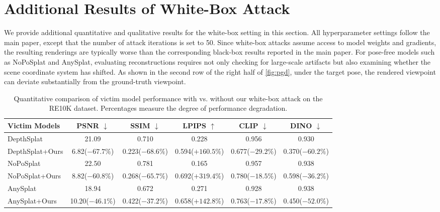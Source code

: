 \clearpage
\section{Additional Results of White-Box Attack}
We provide additional quantitative and qualitative results for the white-box setting in this section. All hyperparameter settings follow the main paper, except that the number of attack iterations is set to 50. Since white-box attacks assume access to model weights and gradients, the resulting renderings are typically worse than the corresponding black-box results reported in the main paper. For pose-free models such as NoPoSplat and AnySplat, evaluating reconstructions requires not only checking for large-scale artifacts but also examining whether the scene coordinate system has shifted. As shown in the second row of the right half of \cref{fig:pgd}, under the target pose, the rendered viewpoint can deviate substantially from the ground-truth viewpoint.

\begin{table}[h]
\centering
\caption{Quantitative comparison of victim model performance with vs. without our white-box attack on the RE10K dataset. Percentages measure the degree of performance degradation.}
\label{tab:re10k_new}
{\fontsize{7pt}{8pt}\selectfont
\begin{tabular}{l ccccc}
\toprule
Victim Models & \cellcolor{gray!20}PSNR $\downarrow$ & \cellcolor{gray!20}SSIM $\downarrow$ & \cellcolor{gray!20}LPIPS $\uparrow$ & \cellcolor{gray!20}CLIP $\downarrow$ & \cellcolor{gray!20}DINO $\downarrow$ \\
\midrule
DepthSplat           & 21.09 & 0.710 & 0.228 & 0.956 & 0.930 \\
DepthSplat+Ours      & 6.82\textcolor[HTML]{B7282E}{\tiny($-67.7\%$)} & 0.223\textcolor[HTML]{B7282E}{\tiny($-68.6\%$)} & 0.594\textcolor[HTML]{B7282E}{\tiny($+160.5\%$)} & 0.677\textcolor[HTML]{B7282E}{\tiny($-29.2\%$)} & 0.370\textcolor[HTML]{B7282E}{\tiny($-60.2\%$)} \\
\midrule
NoPoSplat            & 22.50 & 0.781 & 0.165 & 0.957 & 0.938 \\
NoPoSplat+Ours       & 8.82\textcolor[HTML]{B7282E}{\tiny($-60.8\%$)} & 0.268\textcolor[HTML]{B7282E}{\tiny($-65.7\%$)} & 0.692\textcolor[HTML]{B7282E}{\tiny($+319.4\%$)} & 0.780\textcolor[HTML]{B7282E}{\tiny($-18.5\%$)} & 0.598\textcolor[HTML]{B7282E}{\tiny($-36.2\%$)} \\
\midrule
AnySplat             & 18.94 & 0.672 & 0.271 & 0.928 & 0.938 \\
AnySplat+Ours        & 10.20\textcolor[HTML]{B7282E}{\tiny($-46.1\%$)} & 0.422\textcolor[HTML]{B7282E}{\tiny($-37.2\%$)} & 0.658\textcolor[HTML]{B7282E}{\tiny($+142.8\%$)} & 0.763\textcolor[HTML]{B7282E}{\tiny($-17.8\%$)} & 0.450\textcolor[HTML]{B7282E}{\tiny($-52.0\%$)} \\
\bottomrule
\end{tabular}%
}
\end{table}

